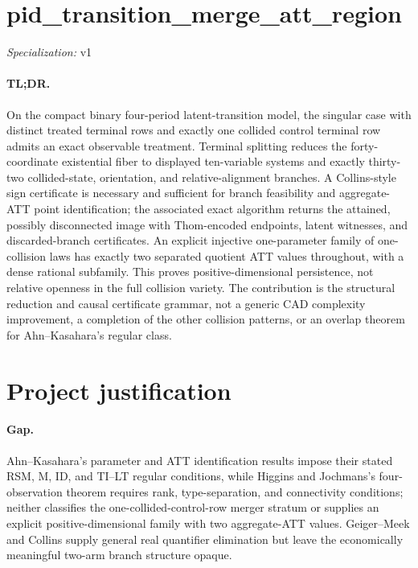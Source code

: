 \documentclass{article}
\begin{document}
\sloppy

\section*{pid\_\allowbreak{}transition\_\allowbreak{}merge\_\allowbreak{}att\_\allowbreak{}region}

\noindent\textit{Specialization:} v1\par

\paragraph{TL;DR.} On the compact binary four-period latent-transition model, the singular case with distinct treated terminal rows and exactly one collided control terminal row admits an exact observable treatment. Terminal splitting reduces the forty-coordinate existential fiber to displayed ten-variable systems and exactly thirty-two collided-state, orientation, and relative-alignment branches. A Collins-style sign certificate is necessary and sufficient for branch feasibility and aggregate-ATT point identification; the associated exact algorithm returns the attained, possibly disconnected image with Thom-encoded endpoints, latent witnesses, and discarded-branch certificates. An explicit injective one-parameter family of one-collision laws has exactly two separated quotient ATT values throughout, with a dense rational subfamily. This proves positive-dimensional persistence, not relative openness in the full collision variety. The contribution is the structural reduction and causal certificate grammar, not a generic CAD complexity improvement, a completion of the other collision patterns, or an overlap theorem for Ahn--Kasahara's regular class.

\section{Project justification}

\paragraph{Gap.} Ahn--Kasahara's parameter and ATT identification results impose their stated RSM, M, ID, and TI--LT regular conditions, while Higgins and Jochmans's four-observation theorem requires rank, type-separation, and connectivity conditions; neither classifies the one-collided-control-row merger stratum or supplies an explicit positive-dimensional family with two aggregate-ATT values. Geiger--Meek and Collins supply general real quantifier elimination but leave the economically meaningful two-arm branch structure opaque.
\end{document}
